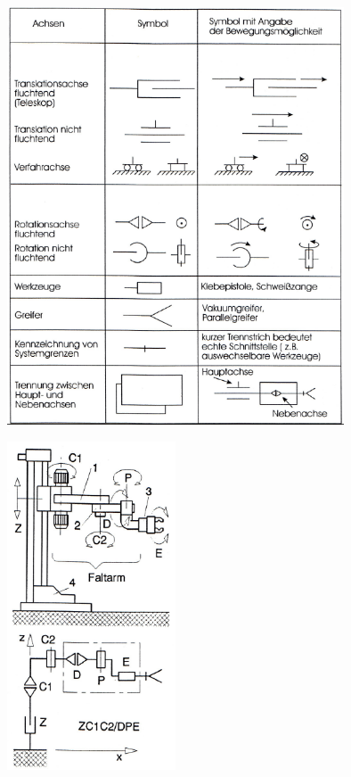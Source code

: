 \begin{minipage}{10cm}
	\includegraphics[width=10cm]{./bilder/symbole.png}
\end{minipage}
\begin{minipage}{8cm}
	\includegraphics[width=5cm]{./bilder/symbole-bsp.png}
\end{minipage}



